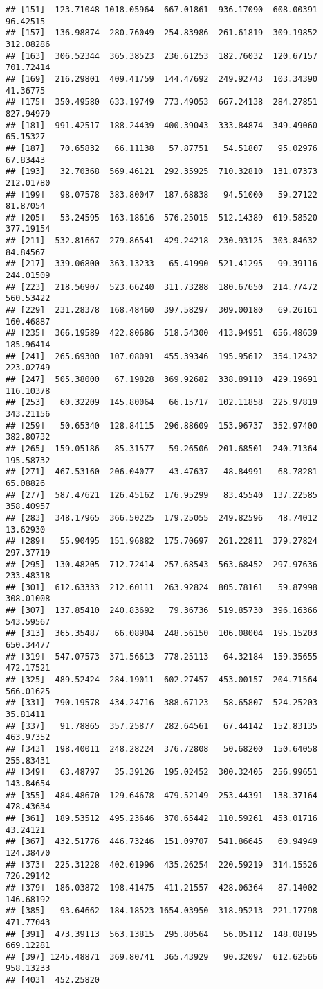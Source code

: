 \documentclass[
]{article}
\begin{document}
\begin{verbatim}
## [151]  123.71048 1018.05964  667.01861  936.17090  608.00391   96.42515
## [157]  136.98874  280.76049  254.83986  261.61819  309.19852  312.08286
## [163]  306.52344  365.38523  236.61253  182.76032  120.67157  701.72414
## [169]  216.29801  409.41759  144.47692  249.92743  103.34390   41.36775
## [175]  350.49580  633.19749  773.49053  667.24138  284.27851  827.94979
## [181]  991.42517  188.24439  400.39043  333.84874  349.49060   65.15327
## [187]   70.65832   66.11138   57.87751   54.51807   95.02976   67.83443
## [193]   32.70368  569.46121  292.35925  710.32810  131.07373  212.01780
## [199]   98.07578  383.80047  187.68838   94.51000   59.27122   81.87054
## [205]   53.24595  163.18616  576.25015  512.14389  619.58520  377.19154
## [211]  532.81667  279.86541  429.24218  230.93125  303.84632   84.84567
## [217]  339.06800  363.13233   65.41990  521.41295   99.39116  244.01509
## [223]  218.56907  523.66240  311.73288  180.67650  214.77472  560.53422
## [229]  231.28378  168.48460  397.58297  309.00180   69.26161  160.46887
## [235]  366.19589  422.80686  518.54300  413.94951  656.48639  185.96414
## [241]  265.69300  107.08091  455.39346  195.95612  354.12432  223.02749
## [247]  505.38000   67.19828  369.92682  338.89110  429.19691  116.10378
## [253]   60.32209  145.80064   66.15717  102.11858  225.97819  343.21156
## [259]   50.65340  128.84115  296.88609  153.96737  352.97400  382.80732
## [265]  159.05186   85.31577   59.26506  201.68501  240.71364  195.58732
## [271]  467.53160  206.04077   43.47637   48.84991   68.78281   65.08826
## [277]  587.47621  126.45162  176.95299   83.45540  137.22585  358.40957
## [283]  348.17965  366.50225  179.25055  249.82596   48.74012   13.62930
## [289]   55.90495  151.96882  175.70697  261.22811  379.27824  297.37719
## [295]  130.48205  712.72414  257.68543  563.68452  297.97636  233.48318
## [301]  612.63333  212.60111  263.92824  805.78161   59.87998  308.01008
## [307]  137.85410  240.83692   79.36736  519.85730  396.16366  543.59567
## [313]  365.35487   66.08904  248.56150  106.08004  195.15203  650.34477
## [319]  547.07573  371.56613  778.25113   64.32184  159.35655  472.17521
## [325]  489.52424  284.19011  602.27457  453.00157  204.71564  566.01625
## [331]  790.19578  434.24716  388.67123   58.65807  524.25203   35.81411
## [337]   91.78865  357.25877  282.64561   67.44142  152.83135  463.97352
## [343]  198.40011  248.28224  376.72808   50.68200  150.64058  255.83431
## [349]   63.48797   35.39126  195.02452  300.32405  256.99651  143.84654
## [355]  484.48670  129.64678  479.52149  253.44391  138.37164  478.43634
## [361]  189.53512  495.23646  370.65442  110.59261  453.01716   43.24121
## [367]  432.51776  446.73246  151.09707  541.86645   60.94949  124.38470
## [373]  225.31228  402.01996  435.26254  220.59219  314.15526  726.29142
## [379]  186.03872  198.41475  411.21557  428.06364   87.14002  146.68192
## [385]   93.64662  184.18523 1654.03950  318.95213  221.17798  471.77043
## [391]  473.39113  563.13815  295.80564   56.05112  148.08195  669.12281
## [397] 1245.48871  369.80741  365.43929   90.32097  612.62566  958.13233
## [403]  452.25820
\end{verbatim}
\end{document}
